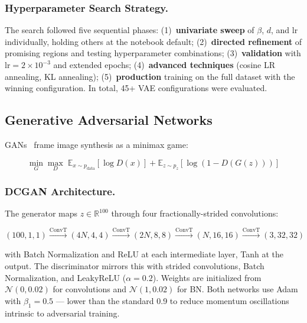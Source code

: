 \documentclass[runningheads]{llncs}
\begin{document}
\subsubsection{Hyperparameter Search Strategy.}\label{sec:vae_search}

The search followed five sequential phases: (1)~\textbf{univariate sweep} of $\beta$, $d$, and lr individually, holding others at the notebook default; (2)~\textbf{directed refinement} of promising regions and testing hyperparameter combinations; (3)~\textbf{validation} with lr$=2{\times}10^{-3}$ and extended epochs; (4)~\textbf{advanced techniques} (cosine LR annealing, KL annealing); (5)~\textbf{production} training on the full dataset with the winning configuration. In total, 45+ VAE configurations were evaluated.

\subsection{Generative Adversarial Networks}\label{sec:gans}

GANs~\cite{radford2015} frame image synthesis as a minimax game:

\begin{equation}
\min_G \max_D \; \mathbb{E}_{x \sim p_\text{data}}[\log D(x)] + \mathbb{E}_{z \sim p_z}[\log(1 - D(G(z)))]
\end{equation}

\subsubsection{DCGAN Architecture.}

The generator maps $z \in \mathbb{R}^{100}$ through four fractionally-strided convolutions:

\begin{equation}
(100,1,1) \xrightarrow{\text{ConvT}} (4N,4,4) \xrightarrow{\text{ConvT}} (2N,8,8) \xrightarrow{\text{ConvT}} (N,16,16) \xrightarrow{\text{ConvT}} (3,32,32)
\end{equation}

with Batch Normalization and ReLU at each intermediate layer, Tanh at the output. The discriminator mirrors this with strided convolutions, Batch Normalization, and LeakyReLU ($\alpha=0.2$). Weights are initialized from $\mathcal{N}(0,0.02)$ for convolutions and $\mathcal{N}(1,0.02)$ for BN. Both networks use Adam with $\beta_1=0.5$ — lower than the standard 0.9 to reduce momentum oscillations intrinsic to adversarial training.
\end{document}
